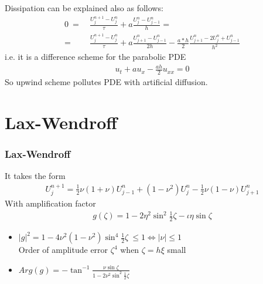 \documentclass{beamer}
\begin{document}
\begin{frame}
Dissipation can be explained also as follows:
\begin{align*}
0 \ = \ & \frac{U_j^{n+1} - U_j^n}{\tau} + a \frac{U_j^n - U_{j-1}^n}{h} = \\
= \ & \frac{U_j^{n+1} - U_j^n}{\tau} + a \frac{U_{j+1}^n - U_{j-1}^n}{2h} - \frac{a * h}{2}\frac{U_{j+1}^n -2U_j^n + U_{j-1}^n}{h^2}
\end{align*}
i.e. it is a difference scheme for the parabolic PDE
\begin{align*}
u_t + a u_x - \frac{a h}{2}u_{xx} = 0
\end{align*}
So upwind scheme pollutes PDE with artificial diffusion.
\end{frame}
\section{Lax-Wendroff}
\begin{frame}
\frametitle{Lax-Wendroff}
It takes the form
\begin{align*}
U_j^{n+1} = \frac{1}{2}\nu(1 + \nu)U_{j-1}^n + (1 - \nu^2)U_j^n - \frac{1}{2}\nu(1 - \nu)U_{j+1}^n
\end{align*}
With amplification factor
\begin{align*}
g(\zeta) = 1 - 2 \eta^2\sin^2{\frac{1}{2}\zeta} - \iota \eta \sin{\zeta}
\end{align*}
\end{frame}
\begin{frame}
\begin{itemize}
\item $|g|^2 = 1 - 4\nu^2(1-\nu^2)\sin^4{\frac{1}{2}\zeta} \ \leq 1 \iff |\nu| \leq 1$ \\ Order of amplitude error $\zeta^4$ when $\zeta = h\xi$ small
\item $Arg(g) = \displaystyle{-\tan^{-1}{\frac{\nu \sin{\zeta}}{1 - 2\nu^2\sin^2{\frac{1}{2}\zeta}}}}$
\end{itemize}
\end{frame}
\end{document}
